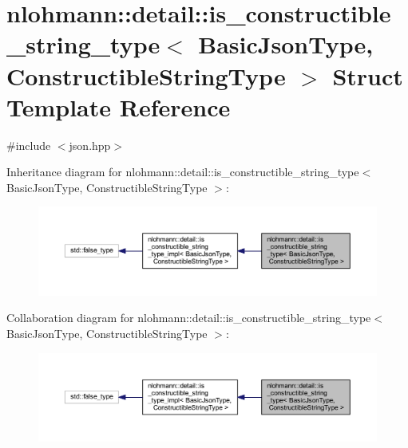 \hypertarget{structnlohmann_1_1detail_1_1is__constructible__string__type}{}\section{nlohmann\+::detail\+::is\+\_\+constructible\+\_\+string\+\_\+type$<$ Basic\+Json\+Type, Constructible\+String\+Type $>$ Struct Template Reference}
\label{structnlohmann_1_1detail_1_1is__constructible__string__type}


{\ttfamily \#include $<$json.\+hpp$>$}



Inheritance diagram for nlohmann\+::detail\+::is\+\_\+constructible\+\_\+string\+\_\+type$<$ Basic\+Json\+Type, Constructible\+String\+Type $>$\+:
\nopagebreak
\begin{figure}[H]
\begin{center}
\leavevmode
\includegraphics[width=350pt]{structnlohmann_1_1detail_1_1is__constructible__string__type__inherit__graph}
\end{center}
\end{figure}


Collaboration diagram for nlohmann\+::detail\+::is\+\_\+constructible\+\_\+string\+\_\+type$<$ Basic\+Json\+Type, Constructible\+String\+Type $>$\+:
\nopagebreak
\begin{figure}[H]
\begin{center}
\leavevmode
\includegraphics[width=350pt]{structnlohmann_1_1detail_1_1is__constructible__string__type__coll__graph}
\end{center}
\end{figure}


